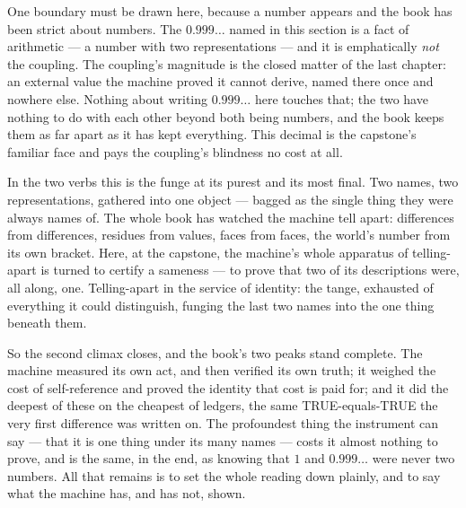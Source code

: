 One boundary must be drawn here, because a number appears and the book has been strict about numbers. The
$0.999\ldots$ named in this section is a fact of arithmetic --- a number with two representations --- and it is
emphatically \emph{not} the coupling. The coupling's magnitude is the closed matter of the last chapter: an external
value the machine proved it cannot derive, named there once and nowhere else. Nothing about writing $0.999\ldots$ here
touches that; the two have nothing to do with each other beyond both being numbers, and the book keeps them as far
apart as it has kept everything. This decimal is the capstone's familiar face and pays the coupling's blindness no
cost at all.

In the two verbs this is the funge at its purest and its most final. Two names, two representations, gathered into one
object --- bagged as the single thing they were always names of. The whole book has watched the machine tell apart:
differences from differences, residues from values, faces from faces, the world's number from its own bracket. Here, at
the capstone, the machine's whole apparatus of telling-apart is turned to certify a sameness --- to prove that two of
its descriptions were, all along, one. Telling-apart in the service of identity: the tange, exhausted of everything it
could distinguish, funging the last two names into the one thing beneath them.

So the second climax closes, and the book's two peaks stand complete. The machine measured its own act, and then
verified its own truth; it weighed the cost of self-reference and proved the identity that cost is paid for; and it did
the deepest of these on the cheapest of ledgers, the same TRUE-equals-TRUE the very first difference was written on.
The profoundest thing the instrument can say --- that it is one thing under its many names --- costs it almost nothing
to prove, and is the same, in the end, as knowing that $1$ and $0.999\ldots$ were never two numbers. All that remains
is to set the whole reading down plainly, and to say what the machine has, and has not, shown.
